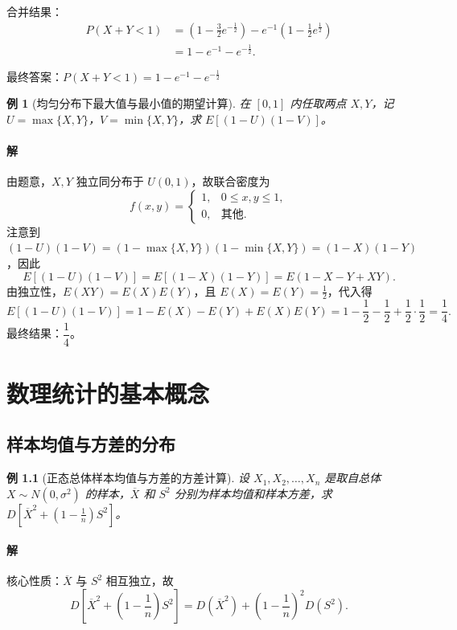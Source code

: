 \documentclass[11pt,a4paper,oneside,openany]{book}
\theoremstyle{yhbthm}
\newtheorem{example}{例}[section]
\begin{document}
合并结果：
\[
\begin{aligned}
P(X+Y < 1) &= \left( 1 - \frac{3}{2} e^{-\frac{1}{2}} \right) - e^{-1} \left( 1 - \frac{1}{2} e^{\frac{1}{2}} \right) \\
&= 1 - e^{-1} - e^{-\frac{1}{2}}.
\end{aligned}
\]

最终答案：$\boxed{P(X+Y < 1) = 1 - e^{-1} - e^{-\frac{1}{2}}}$


\begin{example}[均匀分布下最大值与最小值的期望计算]
在 $[0,1]$ 内任取两点 $X,Y$，记 $U = \max\{X,Y\}$，$V = \min\{X,Y\}$，求 $E[(1-U)(1-V)]$。
\end{example}

\subsubsection{解}
由题意，$X,Y$ 独立同分布于 $U(0,1)$，故联合密度为
\[
f(x,y) = \begin{cases}
1, & 0 \le x,y \le 1, \\
0, & \text{其他}.
\end{cases}
\]
注意到 $(1-U)(1-V) = (1-\max\{X,Y\})(1-\min\{X,Y\}) = (1-X)(1-Y)$，因此
\[
E[(1-U)(1-V)] = E[(1-X)(1-Y)] = E(1 - X - Y + XY).
\]
由独立性，$E(XY) = E(X)E(Y)$，且 $E(X) = E(Y) = \frac{1}{2}$，代入得
\[
E[(1-U)(1-V)] = 1 - E(X) - E(Y) + E(X)E(Y) = 1 - \frac{1}{2} - \frac{1}{2} + \frac{1}{2} \cdot \frac{1}{2} = \frac{1}{4}.
\]
最终结果：$\boxed{\dfrac{1}{4}}$。

\chapter{数理统计的基本概念}
\section{样本均值与方差的分布}

\begin{example}[正态总体样本均值与方差的方差计算]
设 $X_1,X_2,\dots,X_n$ 是取自总体 $X \sim N(0,\sigma^2)$ 的样本，$\overline{X}$ 和 $S^2$ 分别为样本均值和样本方差，求 $D\left[\overline{X}^2 + \left(1 - \frac{1}{n}\right)S^2\right]$。
\end{example}

\subsubsection{解}
核心性质：$\overline{X}$ 与 $S^2$ 相互独立，故
\[
D\left[\overline{X}^2 + \left(1 - \frac{1}{n}\right)S^2\right] = D(\overline{X}^2) + \left(1 - \frac{1}{n}\right)^2 D(S^2).
\]
\end{document}
